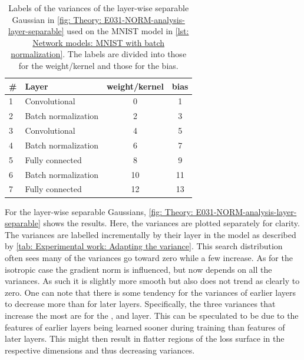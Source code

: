 \begin{table}[!tbp]
    \centering
    \begin{tabular}{llcc}
\toprule
\# & Layer  & weight/kernel & bias\\
\midrule
1 & Convolutional         &  0  &  1\\
2 & Batch normalization   &  2  &  3\\
3 & Convolutional         &  4  &  5\\
4 & Batch normalization   &  6  &  7\\
5 & Fully connected       &  8  &  9\\
6 & Batch normalization   &  10  &  11\\
7 & Fully connected       &  12  &  13\\
\bottomrule
    \end{tabular}
    \caption{Labels of the variances of the layer-wise separable Gaussian in \autoref{fig: Theory: E031-NORM-analysis-layer-separable} used on the \gls{MNIST} model in \autoref{lst: Network models: MNIST with batch normalization}. The labels are divided into those for the weight/kernel and those for the bias.}
    \label{tab: Experimental work: Adapting the variance}
\end{table}

For the layer-wise separable Gaussians, \autoref{fig: Theory: E031-NORM-analysis-layer-separable} shows the results.
Here, the variances are plotted separately for clarity. 
The variances are labelled incrementally by their layer in the model as described by \autoref{tab: Experimental work: Adapting the variance}. This search distribution often sees many of the variances go toward zero while a few increase.
As for the isotropic case the gradient norm is influenced, but now depends on all the variances. As such it is slightly more smooth but also does not trend as clearly to zero.
One can note that there is some tendency for the variances of earlier layers to decrease more than for later layers. Specifically, the three variances that increase the most are for the ,  and  layer. This can be speculated to be due to the features of earlier layers being learned sooner during training than features of later layers. This might then result in flatter regions of the loss surface in the respective dimensions and thus decreasing variances.

